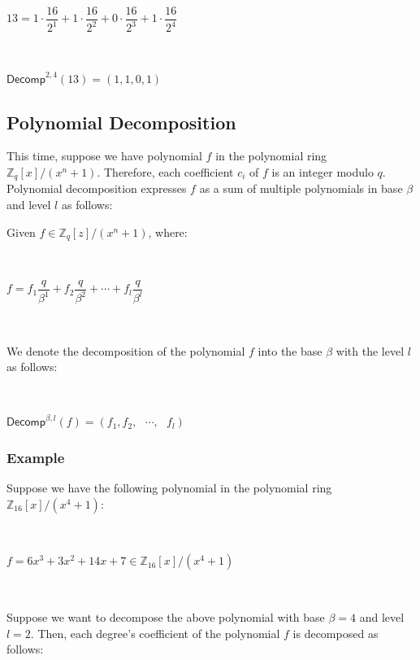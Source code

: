 $ $

$13 = 1 \cdot \dfrac{16}{2^1} + 1 \cdot \dfrac{16}{2^2} + 0 \cdot \dfrac{16}{2^3} + 1 \cdot \dfrac{16}{2^4}$

$ $

$\textsf{Decomp}^{2, 4}(13) = (1, 1, 0, 1)$


\subsection{Polynomial Decomposition}
\label{subsec:poly-decomp}

This time, suppose we have polynomial $f$ in the polynomial ring ${\mathbb{Z}_q[x] / (x^n + 1)}$. Therefore, each coefficient $c_i$ of $f$ is an integer modulo $q$. Polynomial decomposition expresses $f$ as a sum of multiple polynomials in base $\beta$ and level $l$ as follows:


\begin{tcolorbox}[title={\textbf{\tboxlabel{\ref*{subsec:poly-decomp}} Polynomial Decomposition}}]

Given $f \in \mathbb{Z}_q[z]/(x^n+1)$, where:

$ $

$f = f_1 \dfrac{q}{\beta^1} + f _2\dfrac{q}{\beta^2} + \cdots + f_l \dfrac{q}{\beta^l}  $

$ $

We denote the decomposition of the polynomial $f$ into the base $\beta$ with the level $l$ as follows:

$ $

$\textsf{Decomp}^{\beta, l}(f) = (f_1, f_2, \text{ } \cdots , \text{ } f_l)$
 $ $
\end{tcolorbox}




\subsubsection{Example}

Suppose we have the following polynomial in the polynomial ring $\mathbb{Z}_{16}[x] / (x^4 + 1)$:

$ $

$f = 6x^3 + 3x^2 + 14x + 7 \in \mathbb{Z}_{16}[x] / (x^4 + 1)$

$ $

Suppose we want to decompose the above polynomial with base $\beta = 4$ and level $l = 2$. Then, each degree's coefficient of the polynomial $f$ is decomposed as follows:

$ $

